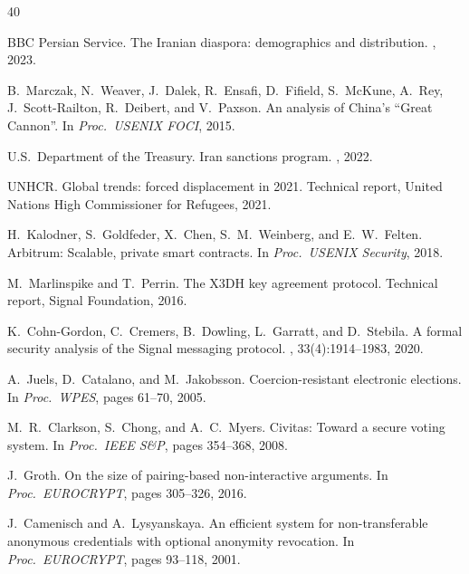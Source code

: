 \documentclass[11pt,a4paper]{article}
\begin{document}
\begin{thebibliography}{40}

BBC Persian Service.
\newblock The Iranian diaspora: demographics and distribution.
, 2023.

B.~Marczak, N.~Weaver, J.~Dalek, R.~Ensafi, D.~Fifield, S.~McKune, A.~Rey, J.~Scott-Railton, R.~Deibert, and V.~Paxson.
\newblock An analysis of {China's} ``{Great Cannon}''.
\newblock In {\em Proc.\ USENIX FOCI}, 2015.

U.S.\ Department of the Treasury.
\newblock Iran sanctions program.
, 2022.

UNHCR.
\newblock Global trends: forced displacement in 2021.
\newblock Technical report, United Nations High Commissioner for Refugees, 2021.

H.~Kalodner, S.~Goldfeder, X.~Chen, S.~M.~Weinberg, and E.~W.~Felten.
\newblock Arbitrum: Scalable, private smart contracts.
\newblock In {\em Proc.\ USENIX Security}, 2018.

M.~Marlinspike and T.~Perrin.
\newblock The {X3DH} key agreement protocol.
\newblock Technical report, Signal Foundation, 2016.

K.~Cohn-Gordon, C.~Cremers, B.~Dowling, L.~Garratt, and D.~Stebila.
\newblock A formal security analysis of the {Signal} messaging protocol.
, 33(4):1914--1983, 2020.

A.~Juels, D.~Catalano, and M.~Jakobsson.
\newblock Coercion-resistant electronic elections.
\newblock In {\em Proc.\ WPES}, pages 61--70, 2005.

M.~R.~Clarkson, S.~Chong, and A.~C.~Myers.
\newblock Civitas: Toward a secure voting system.
\newblock In {\em Proc.\ IEEE S\&P}, pages 354--368, 2008.

J.~Groth.
\newblock On the size of pairing-based non-interactive arguments.
\newblock In {\em Proc.\ EUROCRYPT}, pages 305--326, 2016.

J.~Camenisch and A.~Lysyanskaya.
\newblock An efficient system for non-transferable anonymous credentials with optional anonymity revocation.
\newblock In {\em Proc.\ EUROCRYPT}, pages 93--118, 2001.


\end{thebibliography}
\end{document}
